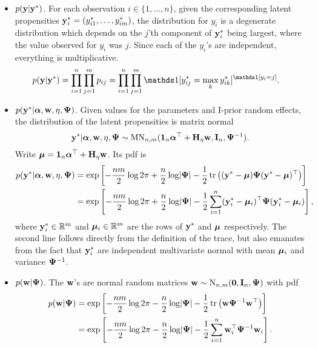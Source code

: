\begin{itemize}
  \item {\boldmath$p(\by|\by^*)$}. For each observation $i\in\{1,\dots,n\}$, given the corresponding latent propensities $\by^*_i = (y_{i1}^*,\dots,y_{im}^*)$, the distribution for $y_i$ is a degenerate distribution which depends on the $j$'th component of $\by^*_i$ being largest, where the value observed for $y_i$ was $j$. Since each of the $y_i$'s are independent, everything is multiplicative.
  \begin{align*}
    p(\by|\by^*) &= \prod_{i=1}^n \prod_{j=1}^m p_{ij} 
    = \prod_{i=1}^n \prod_{j=1}^m \ind[y_{ij}^* 
    = \max_k y_{ik}^*]^{\ind[y_i = j]}.
  \end{align*}
  
  \item {\boldmath$p(\by^*|\balpha,\bw,\eta,\bPsi)$}. Given values for the parameters and I-prior random effects, the distribution of the latent propensities is matrix normal
  \[
    \by^*|\balpha,\bw,\eta,\bPsi \sim \MN_{n,m}(\bone_n\balpha^\top + \bH_\eta\bw, \bI_n, \bPsi^{-1}).
  \]
  Write $\bmu = \bone_n\balpha^\top + \bH_\eta\bw$.
  Its pdf is
  \begin{align*}
    p(\by^*|\balpha,\bw,\eta,\bPsi)
    &= \exp \left[-\half[nm]\log 2\pi + \half[n]\log\abs{\bPsi} - \half\tr \big((\by^* - \bmu) \bPsi (\by^* - \bmu)^\top  \big)  \right] \\
    &= \exp \left[-\half[nm]\log 2\pi + \half[n]\log\abs{\bPsi} - \half\sum_{i=1}^n (\by^*_i - \bmu_i)^\top \bPsi (\by^*_i - \bmu_i)   \right],
  \end{align*}
  where $\by^*_i \in\bbR^m$ and $\bmu_i \in\bbR^m$ are the rows of $\by^*$ and $\bmu$ respectively.
  The second line follows directly from the definition of the trace, but  also emanates from the fact that $\by_i^*$ are independent multivariate normal with mean $\bmu_i$ and variance $\bPsi^{-1}$.
  
  \item {\boldmath$p(\bw|\bPsi)$}. The $\bw$'s are normal random matrices $\bw \sim \N_{n,m}(\bzero, \bI_n,\bPsi)$ with pdf
  \begin{align*}
    p(\bw|\bPsi) 
    &= \exp \left[-\half[nm]\log 2\pi - \half[n]\log\abs{\bPsi} - \half\tr \big( \bw \bPsi^{-1} \bw^\top \big)  \right] \\
    &= \exp \left[-\half[nm]\log 2\pi - \half[n]\log\abs{\bPsi} - \half\sum_{i=1}^n  \bw_i^\top \bPsi^{-1} \bw_i   \right].
  \end{align*}
  

\end{itemize}
